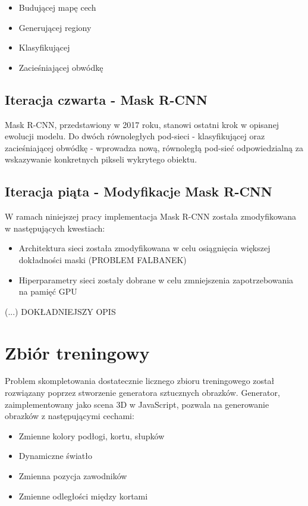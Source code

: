 \begin{itemize}
	\item Budującej mapę cech
	\item Generującej regiony
	\item Klasyfikującej
	\item Zacieśniającej obwódkę
\end{itemize}

\subsection{Iteracja czwarta - Mask R-CNN}

Mask R-CNN, przedstawiony w 2017 roku, stanowi ostatni krok w opisanej ewolucji modelu. Do dwóch równoległych pod-sieci - klasyfikującej oraz zacieśniającej obwódkę - wprowadza nową, równoległą pod-sieć odpowiedzialną za wskazywanie konkretnych pikseli wykrytego obiektu.

\subsection{Iteracja piąta - Modyfikacje Mask R-CNN}

W ramach niniejszej pracy implementacja Mask R-CNN została zmodyfikowana w następujących kwestiach:

\begin{itemize}
	\item Architektura sieci została zmodyfikowana w celu osiągnięcia większej dokładności maski (PROBLEM FALBANEK)
	\item Hiperparametry sieci zostały dobrane w celu zmniejszenia zapotrzebowania na pamięć GPU
\end{itemize}

(...) DOKŁADNIEJSZY OPIS

\section{Zbiór treningowy}

Problem skompletowania dostatecznie licznego zbioru treningowego został rozwiązany poprzez stworzenie generatora sztucznych obrazków. Generator, zaimplementowany jako scena 3D w JavaScript, pozwala na generowanie obrazków z następującymi cechami:

\begin{itemize}
	\item Zmienne kolory podłogi, kortu, słupków
	\item Dynamiczne światło
	\item Zmienna pozycja zawodników
	\item Zmienne odległości między kortami
\end{itemize}

